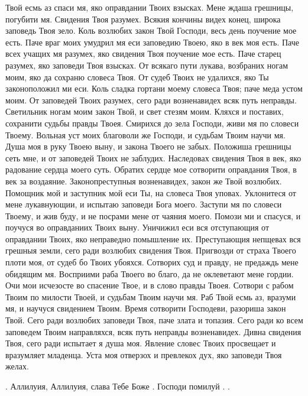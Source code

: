 \begin{mymulticols}
Твой есмь аз спаси мя, яко оправдании Твоих взысках. Мене ждаша грешницы, погубити мя. Свидения Твоя разумех. Всякия кончины видех конец, широка заповедь Твоя зело. Коль возлюбих закон Твой Господи, весь день поучение мое есть. Паче враг моих умудрил мя еси заповедию Твоею, яко в век моя есть. Паче всех учащих мя разумех, яко свидения Твоя поучение мое есть. Паче старец разумех, яко заповеди Твоя взысках. От всякаго пути лукава, возбраних ногам моим, яко да сохраню словеса Твоя. От судеб Твоих не удалихся, яко Ты законоположил ми еси. Коль сладка гортани моему словеса Твоя; паче меда устом моим. От заповедей Твоих разумех, сего ради возненавидех всяк путь неправды. Светильник ногам моим закон Твой, и свет стезям моим. Кляхся и поставих, сохранити судьбы правды Твоея. Смирихся до зела Господи, живи мя по словеси Твоему. Вольная уст моих благоволи же Господи, и судьбам Твоим научи мя. Душа моя в руку Твоею выну, и закона Твоего не забых. Положиша грешницы сеть мне, и от заповедей Твоих не заблудих. Наследовах свидения Твоя в век, яко радование сердца моего суть. Обратих сердце мое сотворити оправдания Твоя, в век за воздаяние. Законопреступныя возненавидех, закон же Твой возлюбих. Помощник мой и заступник мой еси Ты, на словеса Твоя уповах. Уклонитеся от мене лукавнующии, и испытаю заповеди Бога моего. Заступи мя по словеси Твоему, и жив буду, и не посрами мене от чаяния моего. Помози ми и спасуся, и поучуся во оправданиих Твоих выну. Уничижил еси вся отступающия от оправдании Твоих, яко неправедно помышление их. Преступающия непщевах вся грешныя земли, сего ради возлюбих свидения Твоя. Пригвозди от страха Твоего плоти моя, от судеб бо Твоих убояхся. Сотворих суд и правду, не предаждь мене обидящим мя. Восприими раба Твоего во благо, да не оклеветают мене гордии. Очи мои исчезосте во спасение Твое, и в слово правды Твоея. Сотвори с рабом Твоим по милости Твоей, и судьбам Твоим научи мя. Раб Твой есмь аз, вразуми мя, и научуся свидением Твоим. Время сотворити Господеви, разориша закон Твой. Сего ради возлюбих заповеди Твоя, паче злата и топазия. Сего ради ко всем заповедем Твоим направляхся, всяк путь неправды возненавидех. Дивна свидения Твоя, сего ради испытает я душа моя. Явление словес Твоих просвещает и вразумляет младенца. Уста моя отверзох и превлекох дух, яко заповеди Твоя желах. 

. Аллилуия, Аллилуия, слава Тебе Боже . Господи помилуй . .



\end{mymulticols}
